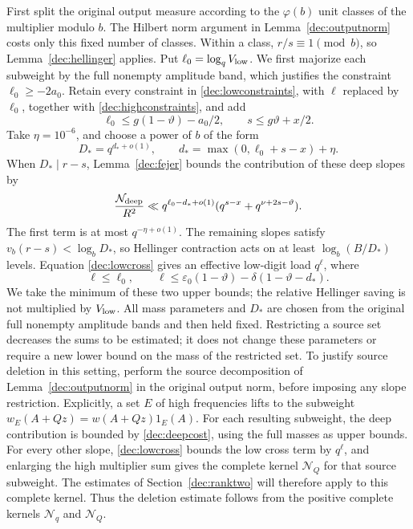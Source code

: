 \documentclass[11pt,a4paper]{article}
\theoremstyle{paperplain}
\numberwithin{equation}{section}
\begin{document}
First split the original output measure according to the
$\varphi(b)$ unit classes of the multiplier modulo $b$.
The Hilbert norm argument in Lemma~\ref{dec:outputnorm} costs only
this fixed number of classes. Within a class, $r/s\equiv1\pmod b$,
so Lemma~\ref{dec:hellinger} applies. Put $\ell_0=\log_qV_{\rm low}$.
We first majorize each subweight by the full nonempty amplitude band,
which justifies the constraint $\ell_0\ge-2a_0$.
Retain every constraint in \eqref{dec:lowconstraints}, with $\ell$
replaced by $\ell_0$, together with \eqref{dec:highconstraints}, and add
\begin{equation}\label{dec:newconstraints}
 \ell_0\le g(1-\vartheta)-a_0/2,\qquad s\le g\vartheta+x/2.
\end{equation}
Take $\eta=10^{-6}$, and choose a power of $b$ of the form
\begin{equation}\label{dec:deepchoice}
 D_*=q^{d_*+o(1)},\qquad d_*=\max(0,\ell_0+s-x)+\eta.
\end{equation}
When $D_*\mid r-s$, Lemma~\ref{dec:fejer} bounds the contribution
of these deep slopes by
\begin{equation}\label{dec:deepcost}
 \frac{\mathcal N_{\rm deep}}{R^2}
 \ll q^{\ell_0-d_*+o(1)}
       (q^{s-x}+q^{\nu+2s-\vartheta}).
\end{equation}
The first term is at most $q^{-\eta+o(1)}$.
The remaining slopes satisfy $v_b(r-s)<\log_bD_*$, so Hellinger
contraction acts on at least $\log_b(B/D_*)$ levels.
Equation \eqref{dec:lowcross} gives an effective low-digit load
$q^\ell$, where
\begin{equation}\label{dec:effectiveell}
 \ell\le\ell_0,\qquad
 \ell\le\varepsilon_0(1-\vartheta)-\delta(1-\vartheta-d_*).
\end{equation}
We take the minimum of these two upper bounds; the relative Hellinger
saving is not multiplied by $V_{\rm low}$.
All mass parameters and $D_*$ are chosen from the original full nonempty
amplitude bands and then held fixed. Restricting a source set decreases
the sums to be estimated; it does not change these parameters or require
a new lower bound on the mass of the restricted set.
To justify source deletion in this setting, perform the source
decomposition of Lemma~\ref{dec:outputnorm} in the original output
norm, before imposing any slope restriction.
Explicitly, a set $E$ of high frequencies lifts to the subweight
$w_E(A+Qz)=w(A+Qz)1_E(A)$.
For each resulting subweight, the deep contribution is bounded by
\eqref{dec:deepcost}, using the full masses as upper bounds.
For every other slope, \eqref{dec:lowcross} bounds the low cross term
by $q^\ell$, and enlarging the high multiplier sum gives the complete
kernel $\mathcal N_Q$ for that source subweight.
The estimates of Section~\ref{dec:ranktwo} will therefore apply to
this complete kernel.
Thus the deletion estimate follows from the positive complete kernels
$\mathcal N_q$ and $\mathcal N_Q$.
\end{document}
